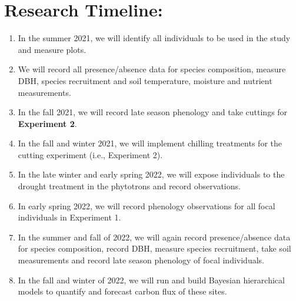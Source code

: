 \documentclass[11pt]{article}\usepackage[]{graphicx}\usepackage[]{color}
\begin{document}
\section* {\textbf{Research Timeline:}}
  \begin{enumerate}
  \item In the summer 2021, we will identify all individuals to be used in the study and measure plots. 
  \item We will record all presence/absence data for species composition, measure DBH, species recruitment and soil temperature, moisture and nutrient measurements. 
  \item In the fall 2021, we will record late season phenology and take cuttings for \textbf{Experiment 2}. 
  \item In the fall and winter 2021, we will implement chilling treatments for the cutting experiment (i.e., Experiment 2). 
  \item In the late winter and early spring 2022, we will expose individuals to the drought treatment in the phytotrons and record observations. 
  \item In early spring 2022, we will record phenology observations for all focal individuals in Experiment 1.
  \item In the summer and fall of 2022, we will again record presence/absence data for species composition, record DBH, measure species recruitment, take soil measurements and record late season phenology of focal individuals. 
  \item In the fall and winter of 2022, we will run and build Bayesian hierarchical models to quantify and forecast carbon flux of these sites. 
  \end{enumerate}
\fi



\end{document}
